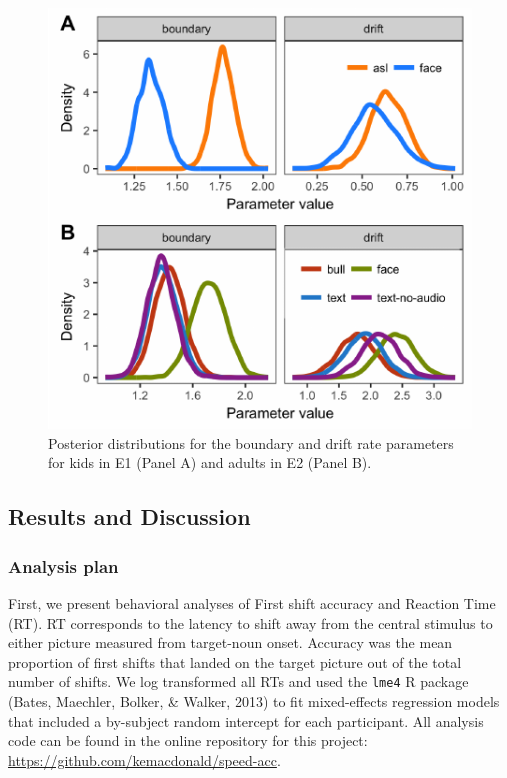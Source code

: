 \documentclass[10pt, letterpaper]{article}
\newenvironment{CodeChunk}{}{}
\begin{document}
\begin{CodeChunk}
\begin{figure}[t]

{\centering \includegraphics{figs/hddm_plot-1} 

}

\caption[Posterior distributions for the boundary and drift rate parameters for kids in E1 (Panel A) and adults in E2 (Panel B)]{Posterior distributions for the boundary and drift rate parameters for kids in E1 (Panel A) and adults in E2 (Panel B).}\label{fig:hddm_plot}
\end{figure}
\end{CodeChunk}

\subsection{Results and Discussion}\label{results-and-discussion}

\subsubsection{Analysis plan}\label{analysis-plan}

First, we present behavioral analyses of First shift accuracy and
Reaction Time (RT). RT corresponds to the latency to shift away from the
central stimulus to either picture measured from target-noun onset.
Accuracy was the mean proportion of first shifts that landed on the
target picture out of the total number of shifts. We log transformed all
RTs and used the \texttt{lme4} R package (Bates, Maechler, Bolker, \&
Walker, 2013) to fit mixed-effects regression models that included a
by-subject random intercept for each participant. All analysis code can
be found in the online repository for this project:
\url{https://github.com/kemacdonald/speed-acc}.
\end{document}
